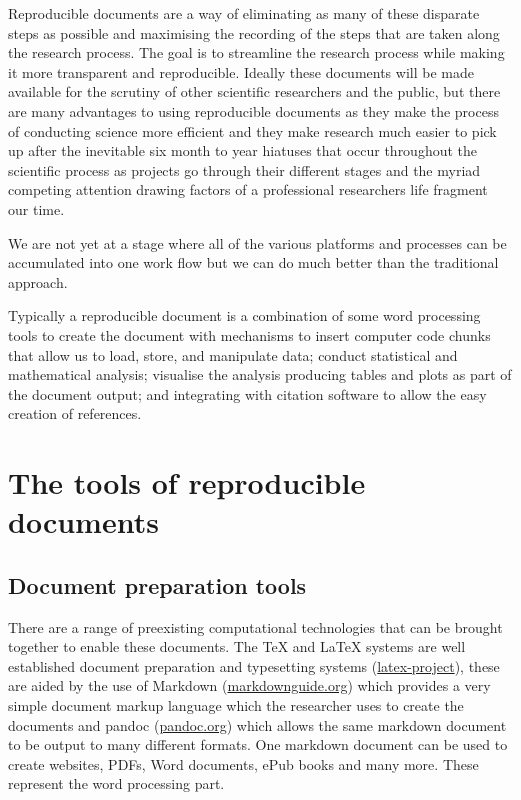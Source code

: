 \documentclass[
  letterpaper,
  DIV=11,
  numbers=noendperiod]{scrreprt}
\begin{document}
Reproducible documents are a way of eliminating as many of these
disparate steps as possible and maximising the recording of the steps
that are taken along the research process. The goal is to streamline the
research process while making it more transparent and reproducible.
Ideally these documents will be made available for the scrutiny of other
scientific researchers and the public, but there are many advantages to
using reproducible documents as they make the process of conducting
science more efficient and they make research much easier to pick up
after the inevitable six month to year hiatuses that occur throughout
the scientific process as projects go through their different stages and
the myriad competing attention drawing factors of a professional
researchers life fragment our time.

We are not yet at a stage where all of the various platforms and
processes can be accumulated into one work flow but we can do much
better than the traditional approach.

Typically a reproducible document is a combination of some word
processing tools to create the document with mechanisms to insert
computer code chunks that allow us to load, store, and manipulate data;
conduct statistical and mathematical analysis; visualise the analysis
producing tables and plots as part of the document output; and
integrating with citation software to allow the easy creation of
references.

\section{The tools of reproducible
documents}\label{the-tools-of-reproducible-documents}

\subsection{Document preparation
tools}\label{document-preparation-tools}

There are a range of preexisting computational technologies that can be
brought together to enable these documents. The TeX and LaTeX systems
are well established document preparation and typesetting systems
(\href{https://www.latex-project.org}{latex-project}), these are aided
by the use of Markdown
(\href{https://www.markdownguide.org}{markdownguide.org}) which provides
a very simple document markup language which the researcher uses to
create the documents and pandoc (\href{https://pandoc.org}{pandoc.org})
which allows the same markdown document to be output to many different
formats. One markdown document can be used to create websites, PDFs,
Word documents, ePub books and many more. These represent the word
processing part.
\end{document}
